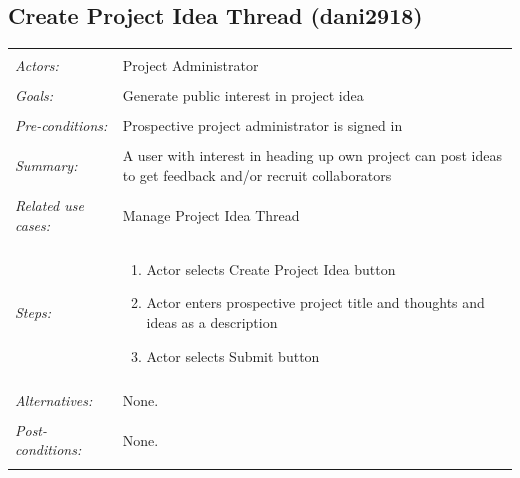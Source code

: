 \documentclass[11pt]{report}
\begin{document}
\subsection{Create Project Idea Thread (dani2918)}
\begin{tabular}{ p{2cm} p{12cm} }
 \hline
 \\
 \textit{Actors:} & Project Administrator \\ 
 \\
 \textit{Goals:} & Generate public interest in project idea  \\
 \\
 \textit{Pre-conditions:} & Prospective project administrator is signed in  \\
 \\
 \textit{Summary:} &  A user with interest in heading up own project can post ideas to get feedback and/or recruit collaborators \\ 
 \\
 \textit{Related use cases:} & Manage Project Idea Thread \\ 
 \\
 \textit{Steps:} & \begin{enumerate}
  \item Actor selects Create Project Idea button
  \item Actor enters prospective project title and thoughts and ideas as a description
  \item Actor selects Submit button

 \end{enumerate} \\
 \\
 \textit{Alternatives:} & None. \\
 \\
 \textit{Post-conditions:} & None. \\
 \\
\hline
\end{tabular}
\end{document}
